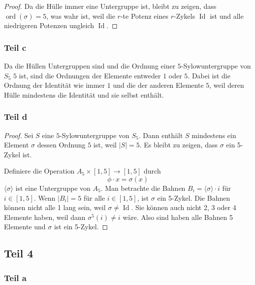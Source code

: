 \documentclass[10pt,a4paper]{article}
\DeclareMathOperator{\Id}{Id}
\DeclareMathOperator{\ord}{ord}
\begin{document}
\begin{proof}
  Da die Hülle immer eine Untergruppe ist, bleibt zu zeigen, dass $\ord(\sigma) = 5$, was wahr ist, weil die $r$-te Potenz eines $r$-Zykels $\Id$ ist und alle niedrigeren Potenzen ungleich $\Id$.
\end{proof}

\subsubsection{Teil c}

Da die Hüllen Untergruppen sind und die Ordnung einer $5$-Sylowuntergruppe von $S_{5}$ $5$ ist, sind die Ordnungen der Elemente entweder $1$ oder $5$.
Dabei ist die Ordnung der Identität wie immer $1$ und die der anderen Elemente $5$, weil deren Hülle mindestens die Identität und sie selbst enthält.

\subsubsection{Teil d}

\begin{proof}
  Sei $S$ eine $5$-Sylowuntergruppe von $S_{5}$.
  Dann enthält $S$ mindestens ein Element $\sigma$ dessen Ordnung $5$ ist, weil $|S| = 5$.
  Es bleibt zu zeigen, dass $\sigma$ ein 5-Zykel ist.

  Definiere die Operation $A_{5} \times [1, 5] \rightarrow [1, 5]$ durch
  \begin{equation}
    \phi \cdot x = \sigma(x)
  \end{equation}
  $\langle \sigma \rangle$ ist eine Untergruppe von $A_{5}$.
  Man betrachte die Bahnen $B_{i} = \langle \sigma \rangle \cdot i$ für $i \in [1, 5]$.
  Wenn $|B_{i}| = 5$ für alle $i \in [1, 5]$, ist $\sigma$ ein 5-Zykel.
  Die Bahnen können nicht alle 1 lang sein, weil $\sigma \ne \Id$.
  Sie können auch nicht 2, 3 oder 4 Elemente haben, weil dann $\sigma^{5}(i) \ne i$ wäre.
  Also sind haben alle Bahnen 5 Elemente und $\sigma$ ist ein 5-Zykel.
\end{proof}

\subsection{Teil 4}

\subsubsection{Teil a}
\end{document}
